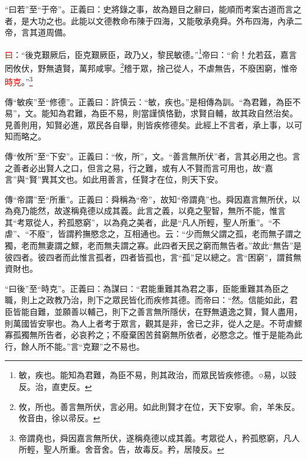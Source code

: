 {\noindent\shu{}\fzkt “曰若”至“于帝”。正義曰：史將錄之事，故為題目之辭曰，能順而考案古道而言之者，是大功之也。此能以文德教命布陳于四海，又能敬承堯舜。外布四海，內承二帝，言其道周備。 \par}

\textcolor{red}{曰}：“後克艱厥后，臣克艱厥臣，政乃乂，黎民敏德。”\footnote{敏，疾也。能知為君難，為臣不易，則其政治，而眾民皆疾修德。○易，以豉反。治，直吏反。}帝曰：“俞！允若茲，嘉言罔攸伏，野無遺賢，萬邦咸寧。\footnote{攸，所也。善言無所伏，言必用。如此則賢才在位，天下安寧。俞，羊朱反。攸音由，徐以帚反。}稽于眾，捨己從人，不虐無告，不廢困窮，惟帝\textcolor{red}{時克}。”\footnote{帝謂堯也，舜因嘉言無所伏，遂稱堯德以成其義。考眾從人，矜孤愍窮，凡人所輕，聖人所重。舍音舍。告，故毒反。矜，居陵反。}

{\noindent\zhuan{}\fzbyks 傳“敏疾”至“修德”。正義曰：許慎云：“敏，疾也。”是相傳為訓。“為君難，為臣不易”，文。能知為君難，為臣不易，則當謹慎恪勤，求賢自輔，故其政自然治矣。見善則用，知賢必進，眾民各自舉，則皆疾修德矣。此經上不言者，承上事，以可知而略之。 \par}

{\noindent\zhuan{}\fzbyks 傳“攸所”至“下安”。正義曰：“攸，所”，文。“善言無所伏”者，言其必用之也。言之善者必出賢人之口，但言之易，行之難，或有人不賢而言可用也，故“嘉言”與“賢”異其文也。如此用善言，任賢才在位，則天下安。 \par}

{\noindent\zhuan{}\fzbyks 傳“帝謂”至“所重”。正義曰：舜稱為“帝”，故知“帝謂堯”也。舜因嘉言無所伏，以為堯乃能然，故遂稱堯德以成其義。此言之義，以堯之聖智，無所不能，惟言其“考眾從人，矜孤愍窮”，以為堯之美者，此是“凡人所輕，聖人所重”。“不虐”、“不廢”，皆謂矜撫愍念之，互相通也。云：“少而無父謂之孤，老而無子謂之獨，老而無妻謂之鰥，老而無夫謂之寡。此四者天民之窮而無告者。”故此“無告”是彼四者。彼四者而此惟言孤者，四者皆孤也，言“孤”足以總之。言“困窮”，謂貧無資財也。 \par}

{\noindent\shu{}\fzkt “曰後”至“時克”。正義曰：為謀曰：“君能重難其為君之事，臣能重難其為臣之職，則上之政教乃治，則下之眾民皆化而疾修其德。而帝曰：“然。信能如此，君臣皆能自難，並願善以輔己，則下之善言無所隱伏，在野無遺逸之賢，賢人盡用，則萬國皆安寧也。為人上者考于眾言，觀其是非，舍已之非，從人之是。不苛虐鰥寡孤獨無所告者，必哀矜之；不廢棄困苦貧窮無所依者，必愍念之。惟于是能為此行，餘人所不能。”言“克艱”之不易也。 \par}

